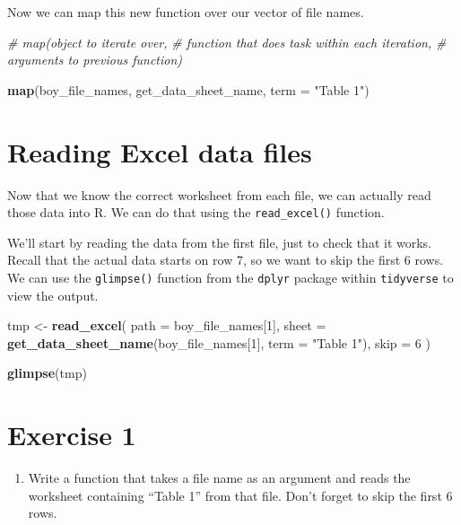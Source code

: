 \documentclass[]{book}
\newenvironment{Shaded}{\begin{snugshade}}{\end{snugshade}}
\newcommand{\KeywordTok}[1]{\textcolor[rgb]{0.13,0.29,0.53}{\textbf{#1}}}
\newcommand{\DataTypeTok}[1]{\textcolor[rgb]{0.13,0.29,0.53}{#1}}
\newcommand{\DecValTok}[1]{\textcolor[rgb]{0.00,0.00,0.81}{#1}}
\newcommand{\StringTok}[1]{\textcolor[rgb]{0.31,0.60,0.02}{#1}}
\newcommand{\CommentTok}[1]{\textcolor[rgb]{0.56,0.35,0.01}{\textit{#1}}}
\newcommand{\NormalTok}[1]{#1}
\providecommand{\tightlist}{%
  \setlength{\itemsep}{0pt}\setlength{\parskip}{0pt}}
\begin{document}
Now we can map this new function over our vector of file names.

\begin{Shaded}
\begin{Highlighting}[]
\CommentTok{# map(object to iterate over, }
\CommentTok{#     function that does task within each iteration, }
\CommentTok{#     arguments to previous function)}
 
\KeywordTok{map}\NormalTok{(boy_file_names,}
\NormalTok{    get_data_sheet_name,}
    \DataTypeTok{term =} \StringTok{"Table 1"}\NormalTok{)}
\end{Highlighting}
\end{Shaded}

\section{Reading Excel data files}\label{reading-excel-data-files}

Now that we know the correct worksheet from each file, we can actually
read those data into R. We can do that using the \texttt{read\_excel()}
function.

We'll start by reading the data from the first file, just to check that
it works. Recall that the actual data starts on row 7, so we want to
skip the first 6 rows. We can use the \texttt{glimpse()} function from
the \texttt{dplyr} package within \texttt{tidyverse} to view the output.

\begin{Shaded}
\begin{Highlighting}[]
\NormalTok{tmp <-}\StringTok{ }\KeywordTok{read_excel}\NormalTok{(}
  \DataTypeTok{path =}\NormalTok{ boy_file_names[}\DecValTok{1}\NormalTok{],}
  \DataTypeTok{sheet =} \KeywordTok{get_data_sheet_name}\NormalTok{(boy_file_names[}\DecValTok{1}\NormalTok{], }\DataTypeTok{term =} \StringTok{"Table 1"}\NormalTok{),}
  \DataTypeTok{skip =} \DecValTok{6}
\NormalTok{)}

\KeywordTok{glimpse}\NormalTok{(tmp)}
\end{Highlighting}
\end{Shaded}

\section{Exercise 1}\label{exercise-1-3}

\begin{enumerate}
\def\labelenumi{\arabic{enumi}.}
\tightlist
\item
  Write a function that takes a file name as an argument and reads the
  worksheet containing ``Table 1'' from that file. Don't forget to skip
  the first 6 rows.
\end{enumerate}
\end{document}
